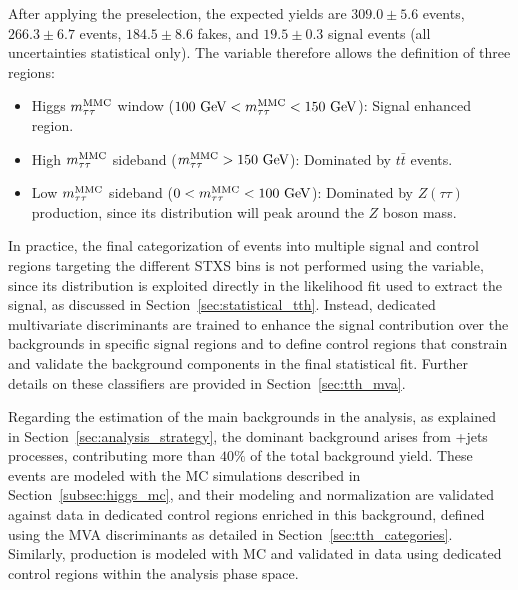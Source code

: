 After applying the preselection, the expected yields are $309.0 \pm 5.6$ \ztautau events, $266.3 \pm 6.7$ \ttbar events, $184.5 \pm 8.6$ fakes, and $19.5 \pm 0.3$ \ttHtt signal events (all uncertainties statistical only). The \mmc variable therefore allows the definition of three regions:
\begin{itemize}
    \small
    \item Higgs $m^\text{MMC}_{\tau\tau}$ window ($100~\text{GeV} < m^\text{MMC}_{\tau\tau} < 150~\text{GeV}$): Signal enhanced region.
    \item High $m^\text{MMC}_{\tau\tau}$ sideband ($m^\text{MMC}_{\tau\tau} > 150~\text{GeV}$): Dominated by $t\bar{t}$ events.
    \item Low $m^\text{MMC}_{\tau\tau}$ sideband ($0 < m^\text{MMC}_{\tau\tau} < 100~\text{GeV}$): Dominated by $Z(\tau\tau)$ production, since its distribution will peak around the $Z$ boson mass.
\end{itemize}

In practice, the final categorization of events into multiple signal and control regions targeting the different STXS bins is not performed using the \mmc variable, since its distribution is exploited directly in the likelihood fit used to extract the signal, as discussed in Section~\ref{sec:statistical_tth}. 
Instead, dedicated multivariate discriminants are trained to enhance the signal contribution over the backgrounds in specific signal regions and to define control regions that constrain and validate the background components in the final statistical fit. 
Further details on these classifiers are provided in Section~\ref{sec:tth_mva}.  

Regarding the estimation of the main backgrounds in the \ttHtt analysis, as explained in Section~\ref{sec:analysis_strategy},
the dominant background arises from \ztautau+jets processes, contributing more than $40\%$ of the total background yield. 
These events are modeled with the MC simulations described in Section~\ref{subsec:higgs_mc}, and their modeling and normalization are validated against data in dedicated control regions enriched in this background, defined using the MVA discriminants as detailed in Section~\ref{sec:tth_categories}. 
Similarly, \ttbar production is modeled with MC and validated in data using dedicated control regions within the analysis phase space.

